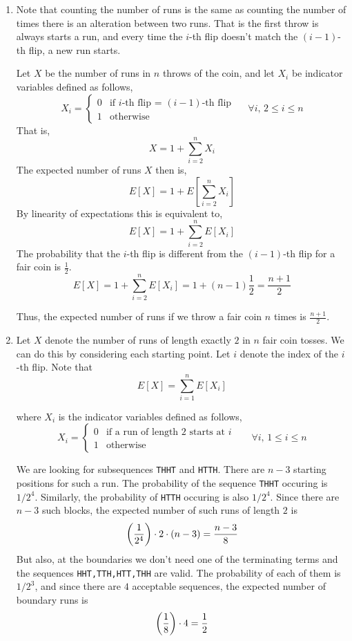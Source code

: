 \documentclass[12pt]{article}
\begin{document}
\begin{solution}

    \bbni 

    \begin{enumerate}
        \item Note that counting the number of runs is the same as counting the number of times there is an alteration between two runs. That is the first throw is always starts a run, and every time the $i$-th flip doesn't match the $(i-1)$-th flip, a new run starts. 
        
        Let $X$ be the number of runs in $n$ throws of the coin, and let $X_i$ be indicator variables defined as follows, 
        \[ X_i = \begin{cases*}
            0 & \text{if $i$-th flip = $(i-1)$-th flip } \\ 
            1 & \text{otherwise}
        \end{cases*} \quad \forall i,\,  2 \leq i \leq n\]
        That is, 
        \[X = 1 + \sum_{i=2}^{n}X_i\]
        The expected number of runs $X$ then is, 
        \[E[X] = 1 + E\left[\sum_{i=2}^{n}X_i\right]\]
        By linearity of expectations this is equivalent to, 
        \[E[X] = 1 + \sum_{i=2}^{n}E[X_i]\]
        The probability that the $i$-th flip is different from the $(i-1)$-th flip for a fair coin is $\frac{1}{2}$. 
        \[E[X] = 1 + \sum_{i=2}^{n}E[X_i] = 1 + (n-1)\frac{1}{2} = \frac{n+1}{2}\]

        Thus, the expected number of runs if we throw a fair coin $n$ times is $\frac{n+1}{2}$. 

        \item Let $X$ denote the number of runs of length exactly $2$ in $n$ fair coin tosses. We can do this by considering each starting point. Let $i$ denote the index of the $i$-th flip. Note that 
        \[E[X] = \sum_{i=1}^{n} E[X_i]\]

        where $X_i$ is the indicator variables defined as follows, 
        \[ X_i = \begin{cases*}
            0 & \text{if a run of length $2$ starts at $i$ } \\ 
            1 & \text{otherwise}
        \end{cases*} \quad \forall i,\,  1 \leq i \leq n\]

        We are looking for subsequences \texttt{THHT} and  \texttt{HTTH}. There are $n-3$ starting positions for such a run. The probability of the sequence \texttt{THHT} occuring is $1/2^4$. Similarly, the probability of \texttt{HTTH} occuring is also $1/2^4$. Since there are $n-3$ such blocks, the expected number of such runs of length $2$ is
        \[\left(\frac{1}{2^4}\right) \cdot 2  \cdot (n-3)= \frac{n-3}{8}\]
        But also, at the boundaries we don't need one of the terminating terms and the sequences  \texttt{HHT,TTH,HTT,THH} are valid. The probability of each of them is $1/2^3$, and since there are $4$ acceptable sequences, the expected number of boundary runs is 
            \[\left(\frac{1}{8}\right) \cdot 4 = \frac{1}{2}\]


\end{enumerate}
\end{solution}
\end{document}
